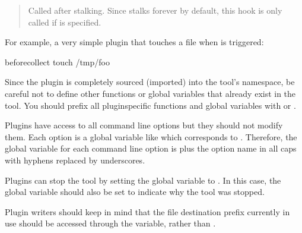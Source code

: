 \documentclass[letterpaper,10pt,english]{sphinxmanual}
\begin{document}
\begin{fulllineitems}
\begin{quote}
Called after stalking.  Since  stalks forever by default,
this hook is only called if {\hyperref[\detokenize{mariadb-stat:cmdoption-mariadb-stat-iterations}]{}} is specified.
\end{quote}

For example, a very simple plugin that touches a file when {\hyperref[\detokenize{mariadb-stat:cmdoption-mariadb-stat-collect}]{}}
is triggered:

\begin{sphinxVerbatim}[commandchars=\\\{\}]
before\PYGZus{}collect 
   touch /tmp/foo
\end{sphinxVerbatim}

Since the plugin is completely sourced (imported) into the tool’s namespace,
be careful not to define other functions or global variables that already
exist in the tool.  You should prefix all plugin\sphinxhyphen{}specific functions and
global variables with  or .

Plugins have access to all command line options but they should not modify
them.  Each option is a global variable like  which corresponds
to {\hyperref[\detokenize{mariadb-stat:cmdoption-mariadb-stat-dest}]{}}.  Therefore, the global variable for each command line option
is  plus the option name in all caps with hyphens replaced by
underscores.

Plugins can stop the tool by setting the global variable 
to .  In this case, the global variable  should also
be set to indicate why the tool was stopped.

Plugin writers should keep in mind that the file destination prefix currently
in use should be accessed through the  variable, rather than
.

\end{fulllineitems}
\end{document}
